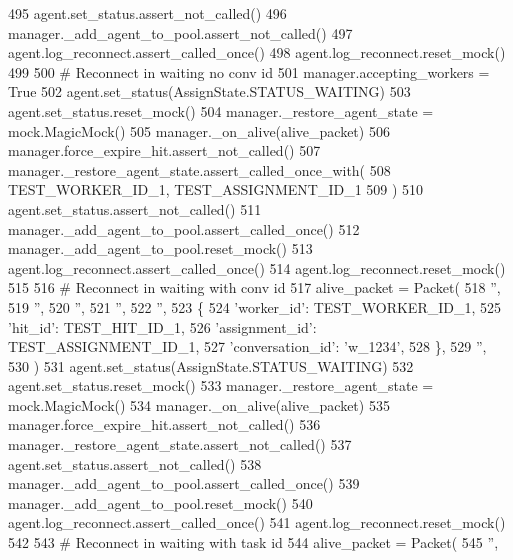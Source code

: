\begin{DoxyCode}
495         agent.set\_status.assert\_not\_called()
496         manager.\_add\_agent\_to\_pool.assert\_not\_called()
497         agent.log\_reconnect.assert\_called\_once()
498         agent.log\_reconnect.reset\_mock()
499 
500         \textcolor{comment}{# Reconnect in waiting no conv id}
501         manager.accepting\_workers = \textcolor{keyword}{True}
502         agent.set\_status(AssignState.STATUS\_WAITING)
503         agent.set\_status.reset\_mock()
504         manager.\_restore\_agent\_state = mock.MagicMock()
505         manager.\_on\_alive(alive\_packet)
506         manager.force\_expire\_hit.assert\_not\_called()
507         manager.\_restore\_agent\_state.assert\_called\_once\_with(
508             TEST\_WORKER\_ID\_1, TEST\_ASSIGNMENT\_ID\_1
509         )
510         agent.set\_status.assert\_not\_called()
511         manager.\_add\_agent\_to\_pool.assert\_called\_once()
512         manager.\_add\_agent\_to\_pool.reset\_mock()
513         agent.log\_reconnect.assert\_called\_once()
514         agent.log\_reconnect.reset\_mock()
515 
516         \textcolor{comment}{# Reconnect in waiting with conv id}
517         alive\_packet = Packet(
518             \textcolor{stringliteral}{''},
519             \textcolor{stringliteral}{''},
520             \textcolor{stringliteral}{''},
521             \textcolor{stringliteral}{''},
522             \textcolor{stringliteral}{''},
523             \{
524                 \textcolor{stringliteral}{'worker\_id'}: TEST\_WORKER\_ID\_1,
525                 \textcolor{stringliteral}{'hit\_id'}: TEST\_HIT\_ID\_1,
526                 \textcolor{stringliteral}{'assignment\_id'}: TEST\_ASSIGNMENT\_ID\_1,
527                 \textcolor{stringliteral}{'conversation\_id'}: \textcolor{stringliteral}{'w\_1234'},
528             \},
529             \textcolor{stringliteral}{''},
530         )
531         agent.set\_status(AssignState.STATUS\_WAITING)
532         agent.set\_status.reset\_mock()
533         manager.\_restore\_agent\_state = mock.MagicMock()
534         manager.\_on\_alive(alive\_packet)
535         manager.force\_expire\_hit.assert\_not\_called()
536         manager.\_restore\_agent\_state.assert\_not\_called()
537         agent.set\_status.assert\_not\_called()
538         manager.\_add\_agent\_to\_pool.assert\_called\_once()
539         manager.\_add\_agent\_to\_pool.reset\_mock()
540         agent.log\_reconnect.assert\_called\_once()
541         agent.log\_reconnect.reset\_mock()
542 
543         \textcolor{comment}{# Reconnect in waiting with task id}
544         alive\_packet = Packet(
545             \textcolor{stringliteral}{''},

\end{DoxyCode}

